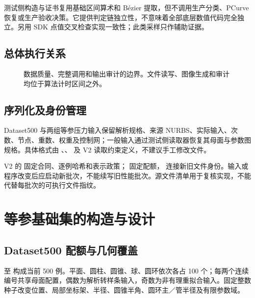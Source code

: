 \documentclass[UTF8,zihao=5,fontset=windows,a4paper]{ctexart}
\begin{document}
测试侧构造与证书复用基础区间算术和 Bézier 提取，但不调用生产分类、PCurve 恢复或生产验收决策。它提供判定链独立性，不意味着全部底层数值代码完全独立。另用 SDK 点值交叉检查实现一致性；此类采样只作辅助证据。

\subsection{总体执行关系}
\begin{figure}[h]\centering
{}
\caption{数据质量、完整调用和输出审计的边界。文件读写、图像生成和审计均位于算法计时区间之外。}
\end{figure}

\subsection{序列化及身份管理}
Dataset500 与两组等参压力输入保留解析规格、来源 NURBS、实际输入、次数、节点、重数、权重及控制网；一般输入通过测试侧读取器恢复其母面与参数图规格。具体格式由 、、 及 V2 读取约束定义，不建议手工修改文件。

V2 的  固定合同、逐例哈希和表示政策； 固定配额， 连接新旧文件身份。输入或程序改变后应启动新批次，不能续写旧性能批次。源文件清单用于复核实现，不能代替每批次的可执行文件指纹。

\newpage
\section{等参基础集的构造与设计}
\subsection{Dataset500 配额与几何覆盖}
 至  构成当前 500 例。平面、圆柱、圆锥、球、圆环依次各占 100 个；每两个连续编号共享母面配置，偶数为解析转样条输入，奇数为非有理重拟合输入。固定整数种子改变位置、局部坐标架、半径、圆锥半角、圆环主／管半径及有限参数域。
\end{document}

